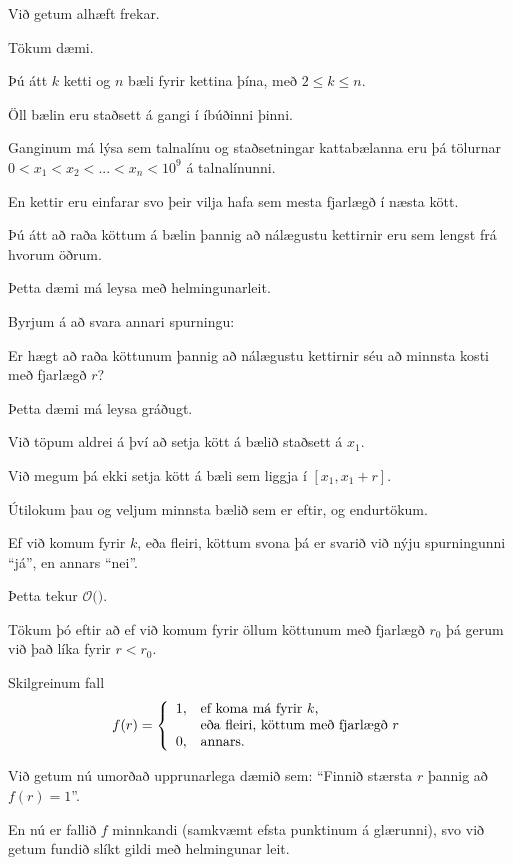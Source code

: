 {
    {
        \item<1-> Við getum alhæft frekar.
        \item<2-> Tökum dæmi.
        \item<3-> Þú átt $k$ ketti og $n$ bæli fyrir kettina þína, með $2 \leq k \leq n$.
        \item<4-> Öll bælin eru staðsett á gangi í íbúðinni þinni.
        \item<5-> Ganginum má lýsa sem talnalínu og staðsetningar kattabælanna eru þá tölurnar 
                    $0 < x_1 < x_2 < ... < x_n < 10^9$ á talnalínunni.
        \item<6-> En kettir eru einfarar svo þeir vilja hafa sem mesta fjarlægð í næsta kött.
        \item<7-> Þú átt að raða köttum á bælin þannig að nálægustu kettirnir eru sem lengst frá hvorum öðrum.
    }
}

{
    {
        \item<1-> Þetta dæmi má leysa með helmingunarleit.
        \item<2-> Byrjum á að svara annari spurningu:
        {
            \item<3-> Er hægt að raða köttunum þannig að nálægustu kettirnir séu að minnsta kosti með fjarlægð $r$?
        }
        \item<4-> Þetta dæmi má leysa gráðugt.
        \item<5-> Við töpum aldrei á því að setja kött á bælið staðsett á $x_1$.
        \item<6-> Við megum þá ekki setja kött á bæli sem liggja í $[x_1, x_1 + r]$.
        \item<7-> Útilokum þau og veljum minnsta bælið sem er eftir, og endurtökum.
        \item<8-> Ef við komum fyrir $k$, eða fleiri, köttum svona þá er svarið við nýju spurningunni ``já'', en annars ``nei''.
        \item<9-> Þetta tekur $\mathcal{O}($$)$.
    }
}

{
    {
        \item<1-> Tökum þó eftir að ef við komum fyrir öllum köttunum með fjarlægð $r_0$ þá gerum við það líka fyrir $r < r_0$.
        \item<2-> Skilgreinum fall
        \[
            f(r) = \left \{ \begin{array}{l l}
            1, & \text{ef koma má fyrir $k$,}\\
              & \text{eða fleiri, köttum með fjarlægð $r$}\\
            0, & \text{annars}.
            \end{array}
            \right .
        \]
        \item<3-> Við getum nú umorðað upprunarlega dæmið sem: ``Finnið stærsta $r$ þannig að $f(r) = 1$''.
        \item<4-> En nú er fallið $f$ minnkandi (samkvæmt efsta punktinum á glærunni), svo við getum fundið slíkt gildi með helmingunar leit.
    }
}

